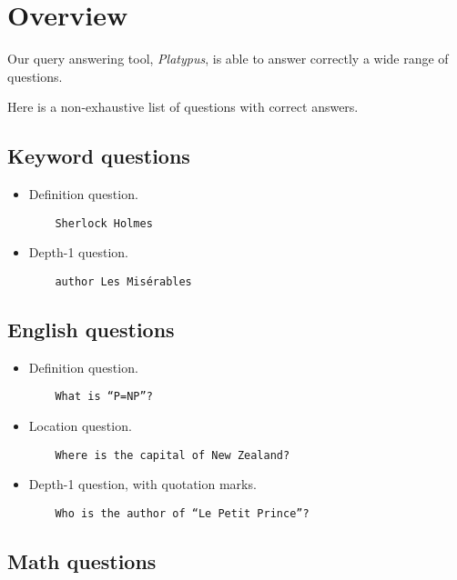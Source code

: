 \section{Overview}

Our query answering tool, \emph{Platypus}, is able to answer correctly a wide range
of questions.

Here is a non-exhaustive list of questions with correct answers.

\subsection{Keyword questions}

\begin{itemize}
    \item Definition question.
    \begin{verbatim}
    Sherlock Holmes
    \end{verbatim}

    \item Depth-1 question.
    \begin{verbatim}
    author Les Misérables
    \end{verbatim}
\end{itemize}

\subsection{English questions}

\begin{itemize}
    \item Definition question.
    \begin{verbatim}
    What is “P=NP”?
    \end{verbatim}

    \item Location question.
    \begin{verbatim}
    Where is the capital of New Zealand?
    \end{verbatim}

    \item Depth-1 question, with quotation marks.
    \begin{verbatim}
    Who is the author of “Le Petit Prince”?
    \end{verbatim}
\end{itemize}

\subsection{Math questions}

